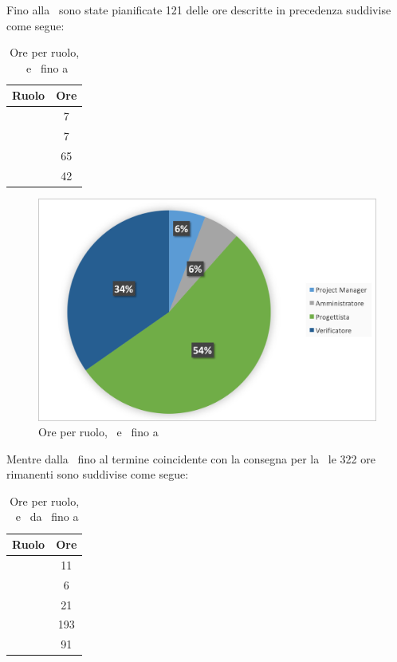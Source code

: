 \newpage
Fino alla \RP\ sono state pianificate 121 delle ore descritte in precedenza suddivise come segue:

\begin{table}[h]
	\begin{center}
		\begin{tabular}{|c|c|}
			\hline
			\textbf{Ruolo}	& \textbf{Ore} \\
			\hline
			\Pm &	7\\
			\hline
			\Am	&	7\\
			\hline
			\Prog	&	65\\
			\hline
			\Ver	&	42\\
			\hline
		\end{tabular}
	\end{center}
	\caption{Ore per ruolo, \PD\ e \COD\ fino a \RP}
\end{table}

\begin{figure}[H]
	\centering 
	\includegraphics[scale=0.7]{Immagini/GraficiTorte/PD.png}
	\caption{Ore per ruolo, \PD\ e \COD\ fino a \RP}
\end{figure}

\newpage
Mentre dalla \RP\ fino al termine coincidente con la consegna per la \RQ\ le 322 ore rimanenti sono suddivise come segue:

\begin{table}[h]
	\begin{center}
		\begin{tabular}{|c|c|}
			\hline
			\textbf{Ruolo}	& \textbf{Ore} \\
			\hline
			\Pm &	11\\
			\hline
			\Am	&	6\\
			\hline
			\Prog	&	21\\
			\hline
			\Progr	&	193\\
			\hline
			\Ver	&	91\\
			\hline
		\end{tabular}
	\end{center}
	\caption{Ore per ruolo, \PD\ e \COD\ da \RP\ fino a \RQ}
\end{table}

